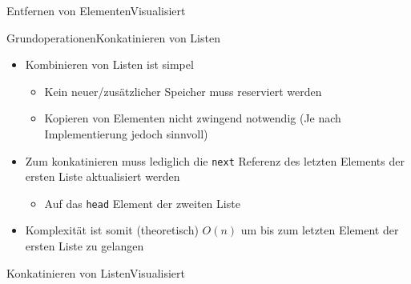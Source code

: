 \begin{frame}{Entfernen von Elementen}{Visualisiert}
\end{frame}

\begin{frame}{Grundoperationen}{Konkatinieren von Listen}
	\begin{itemize}
		\item Kombinieren von Listen ist simpel
		\begin{itemize}
			\item Kein neuer/zusätzlicher Speicher muss reserviert werden
			\item Kopieren von Elementen nicht zwingend notwendig (Je nach Implementierung jedoch sinnvoll)
		\end{itemize}
		\item Zum konkatinieren muss lediglich die \texttt{next} Referenz des letzten Elements der ersten Liste aktualisiert werden
		\begin{itemize}
			\item Auf das \texttt{head} Element der zweiten Liste
		\end{itemize}
		\item Komplexität ist somit (theoretisch) $O(n)$ um bis zum letzten Element der ersten Liste zu gelangen
	\end{itemize}
\end{frame}

\begin{frame}{Konkatinieren von Listen}{Visualisiert}
\end{frame}

